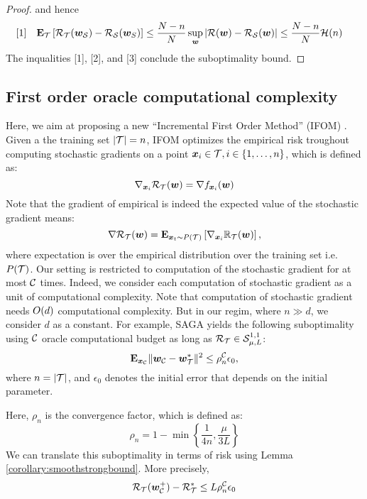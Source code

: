 \documentclass{article}
\begin{document}
\begin{proof}
and hence 
\begin{align}
\text{[1]} \quad & \mathbf{E}_{{\cal T}} \left[ {\cal R}_{\cal T}(\bm{w}_{\cal S}) - {\cal R}_{\cal S}(\bm{w}_S) \right] \le
\frac{N-n}{N} \sup_{\bm{w}} | {\cal R}(\bm{w}) - {\cal R}_{\cal S}(\bm{w}) | \le \frac{N-n}{N} {\cal H}(n)
\label{eq:t-s-all} 
\end{align}
The inqualities [1], [2], and [3] conclude the suboptimality bound. 
\end{proof}

\subsection{First order oracle computational complexity} 
Here, we aim at proposing a new ``Incremental First Order Method'' (IFOM)
\cite{agarwal2015lower}. Given a the training set $|{\cal T}| = n $, IFOM optimizes
the empirical risk troughout computing stochastic gradients on a point $\bm{x}_i \in
{\cal T}, i \in \{ 1,\ldots, n \}$, which is defined as: 
\begin{equation*}
	\nabla_{\bm{x}_i} {\cal R}_{{\cal T}}(\bm{w}) = \nabla f_{\bm{x}_i} (\bm{w})
\end{equation*} 
Note that the gradient of empirical is indeed the expected value of the
stochastic gradient means:
\begin{equation*}
	\nabla {\cal R}_{{\cal T}}(\bm{w}) = \mathbf{E}_{\bm{x}_t \sim P({\cal T})} \left[\nabla_{\bm{x}_i}
	\mathbb{R}_{{\cal T}}(\bm{w})\right],
\end{equation*}
where expectation is over the empirical distribution over the training set
i.e. $P({\cal T})$.
Our setting is restricted to computation of the stochastic gradient for at most
${\cal C}$ times. Indeed, we consider each computation of stochastic gradient as a unit of
computational complexity. Note that computation of stochastic
gradient needs $O(d)$ computational complexity. But in our regim, where $n
\gg d$, we consider $d$ as a constant. 
For example, SAGA yields the following
suboptimality using ${\cal C}$ oracle computational budget \cite{defazio2014saga} as
long as ${\cal R}_{{\cal T}} \in {\cal S}_{\mu,L}^{1,1}$:
\begin{equation*}
	\mathbf{E}_{\bm{x}_{{\cal C}}}\| \bm{w}_{{\cal C}} - \bm{w}^*_{{\cal T}} \|^2 \leq \rho_{n}^{{\cal C}} \epsilon_0,
\end{equation*}
where $n = | {\cal T} |$, and $\epsilon_0$ denotes the initial error that
depends on the initial parameter.

 Here, $\rho_{n}$ is the convergence factor, which is defined as:
\begin{equation*}
	\rho_n = 1- \min\left\{ \frac{1}{4n}, \frac{\mu}{3 L} \right\}
\end{equation*}
We can translate this suboptimality in terms of risk using Lemma
\ref{corollary:smoothstrongbound}. More precisely,
\begin{equation*}
	{\cal R}_{{\cal T}}( \bm{w}_{{\cal C}}^+) - {\cal R}^*_{{\cal T}} \leq L \rho_{n}^{{\cal C}} \epsilon_0
\end{equation*}
\end{document}

